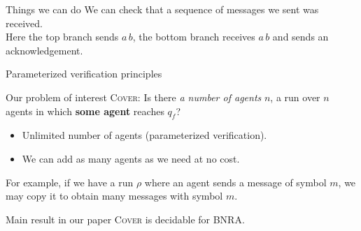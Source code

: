 \documentclass{beamer}
\newcommand{\COVER}{\textsc{Cover}\xspace}
\newcommand{\TARGET}{\textsc{Target}\xspace}
\begin{document}
\begin{frame}{Things we can do}
	We can check that a sequence of messages we sent was received. \\
	Here the top branch sends $a \, b$, the bottom branch receives $a \, b$ and sends an acknowledgement. 
	\vspace{0.5cm}

		\centering
		
\end{frame}

\begin{frame}{Parameterized verification principles}
	
	\begin{block}{Our problem of interest}
		{\COVER}: Is there \emph{a number of agents} $n$, a run over $n$ agents in which \textbf{some agent} reaches $q_f$?
	\end{block}
	
	\pause

	\begin{itemize}
		\item Unlimited number of agents (parameterized verification).
		
		\item We can add as many agents as we need at no cost. 
	\end{itemize}
	
	\pause

	For example, if we have a run $\rho$ where an agent sends a message of symbol $m$, we may copy it to obtain many messages with symbol $m$. 
	
	\pause 

	\begin{block}{Main result in our paper}
		{\COVER} is decidable for BNRA.
	\end{block}
	
\end{frame}
\end{document}
